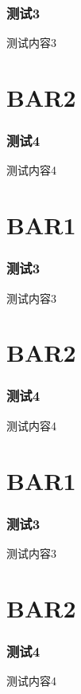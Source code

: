 \documentclass{ctexbeamer}
\begin{document}
    \begin{frame}
        \frametitle{测试3}
    
        测试内容3
    
    \end{frame}

    \section{BAR2}

    \begin{frame}
        \frametitle{测试4}

        测试内容4
    \end{frame}

    

    \section{BAR1}

    \begin{frame}
        \frametitle{测试3}
    
        测试内容3
    
    \end{frame}

    \section{BAR2}

    \begin{frame}
        \frametitle{测试4}

        测试内容4
    \end{frame}

    

    \section{BAR1}

    \begin{frame}
        \frametitle{测试3}
    
        测试内容3
    
    \end{frame}

    \section{BAR2}

    \begin{frame}
        \frametitle{测试4}

        测试内容4
    \end{frame}
\end{document}
